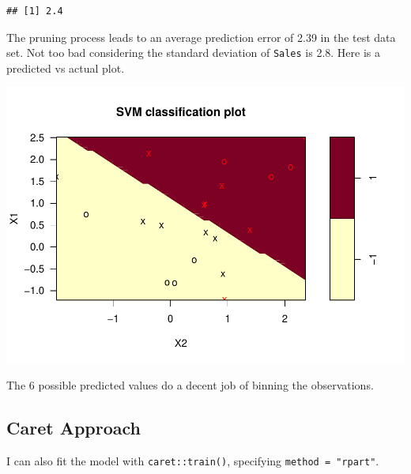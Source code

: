 \documentclass[
]{book}
\newenvironment{Shaded}{\begin{snugshade}}{\end{snugshade}}
\newcommand{\DataTypeTok}[1]{\textcolor[rgb]{0.13,0.29,0.53}{#1}}
\newcommand{\DecValTok}[1]{\textcolor[rgb]{0.00,0.00,0.81}{#1}}
\newcommand{\KeywordTok}[1]{\textcolor[rgb]{0.13,0.29,0.53}{\textbf{#1}}}
\newcommand{\NormalTok}[1]{#1}
\newcommand{\OperatorTok}[1]{\textcolor[rgb]{0.81,0.36,0.00}{\textbf{#1}}}
\newcommand{\StringTok}[1]{\textcolor[rgb]{0.31,0.60,0.02}{#1}}
\begin{document}
\begin{verbatim}
## [1] 2.4
\end{verbatim}

The pruning process leads to an average prediction error of 2.39 in the test data set. Not too bad considering the standard deviation of \texttt{Sales} is 2.8. Here is a predicted vs actual plot.

\begin{Shaded}
\end{Shaded}

\includegraphics{data-sci_files/figure-latex/unnamed-chunk-104-1.pdf}

The 6 possible predicted values do a decent job of binning the observations.

\hypertarget{caret-approach-1}{%
\subsection{Caret Approach}\label{caret-approach-1}}

I can also fit the model with \texttt{caret::train()}, specifying \texttt{method\ =\ "rpart"}.
\end{document}
